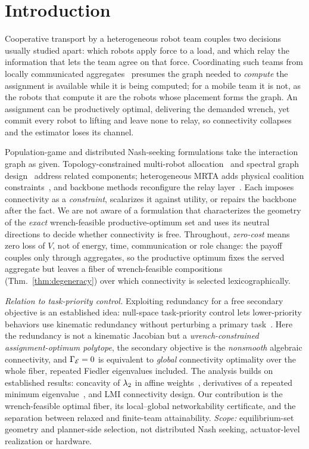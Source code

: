 \section{Introduction}
\label{sec:intro}

Cooperative transport by a heterogeneous robot team couples two decisions usually studied
apart: which robots apply force to a load, and which relay the information that lets the team
agree on that force. Coordinating such teams from locally communicated
aggregates~\cite{martinezpiazuelo2022} presumes the graph needed to \emph{compute} the
assignment is available while it is being computed; for a mobile team it is not, as the robots
that compute it are the robots whose placement forms the graph. An
assignment can be productively optimal, delivering the demanded wrench, yet commit every robot
to lifting and leave none to relay, so connectivity collapses and the estimator loses its
channel.

Population-game and distributed Nash-seeking formulations take the interaction graph as given.
Topology-constrained multi-robot allocation~\cite{williams2017matroid} and spectral graph
design~\cite{ghosh2006growing} address related components; heterogeneous MRTA adds physical
coalition constraints~\cite{calvo2025heterogeneous}, and backbone methods reconfigure the relay
layer~\cite{santos2024backbone}. Each imposes connectivity as a \emph{constraint}, scalarizes
it against utility, or repairs the backbone after the fact. We are not aware of a formulation that characterizes the geometry of the \emph{exact}
wrench-feasible productive-optimum set and uses its neutral directions to decide whether
connectivity is free. Throughout, \emph{zero-cost} means zero loss of $V$, not of energy, time,
communication or role change: the payoff couples only through aggregates, so the productive
optimum fixes the served aggregate but leaves a fiber of wrench-feasible compositions
(Thm.~\ref{thm:degeneracy}) over which connectivity is selected lexicographically.

\emph{Relation to task-priority control.} Exploiting redundancy for a free secondary objective
is an established idea: null-space task-priority control lets lower-priority behaviors use
kinematic redundancy without perturbing a primary task~\cite{antonelli2010nsb}. Here the
redundancy is not a kinematic Jacobian but a \emph{wrench-constrained assignment-optimum
polytope}, the secondary objective is the \emph{nonsmooth} algebraic connectivity, and
$\Gamma_{\mathcal{E}}=0$ is equivalent to \emph{global} connectivity optimality over the whole
fiber, repeated Fiedler eigenvalues included. The analysis builds on established results:
concavity of $\lambda_2$ in affine weights~\cite{fiedler1973,ghosh2006growing}, derivatives of a
repeated minimum eigenvalue~\cite{lewis1996spectral}, and LMI connectivity design. Our contribution is the
wrench-feasible optimal fiber, its local--global networkability certificate, and the
separation between relaxed and finite-team attainability.
\emph{Scope:} equilibrium-set geometry and planner-side selection, not distributed Nash
seeking, actuator-level realization or hardware.

